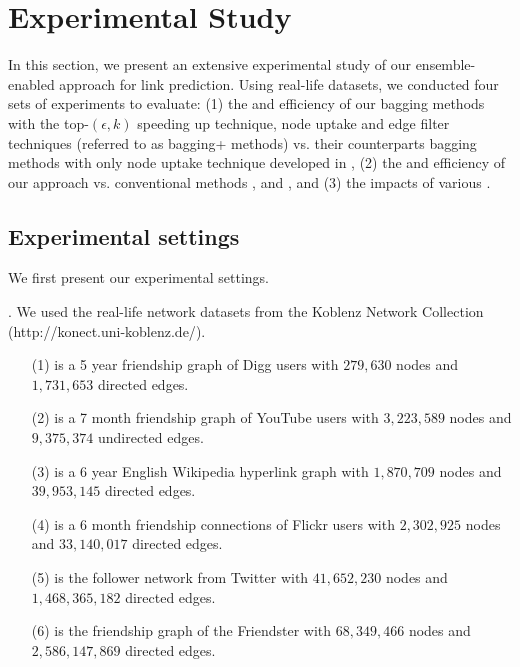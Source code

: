 \section{Experimental Study}
\label{sec-exp}

In this section, we present an extensive experimental study of our ensemble-enabled approach for link prediction.
Using real-life datasets, we conducted four sets of experiments to evaluate:
(1) the  and efficiency of our bagging methods with the top-$(\epsilon, k)$ speeding up technique,
node uptake and edge filter techniques (referred to as bagging+ methods)
vs. their counterparts bagging methods with only node uptake technique developed in \cite{liang2016},
(2) the  and efficiency of our approach vs. conventional methods \Aa \cite{adamic},
 and \BIGCLAM \cite{yang-wsdm2013},
and (3) the impacts of various .


\subsection{Experimental settings}

We first present our experimental settings.

. We used the real-life network datasets
from the Koblenz Network Collection ({\small http://konect.uni-koblenz.de/}).


\begin{enumerate}

\item[(1)] \Digg is a 5 year friendship graph of Digg users with
$279,630$ nodes and $1,731,653$ directed edges.

\item[(2)] \YouTube is a 7 month  friendship graph of YouTube users
with $3,223,589$ nodes and $9,375,374$ undirected edges.

\item[(3)]  \Wikipedia is a 6 year English Wikipedia hyperlink graph
with $1,870,709$ nodes and $39,953,145$ directed edges.

\item[(4)]  \Flickr is a 6 month friendship connections of Flickr users
with $2,302,925$ nodes and $33,140,017$ directed edges.

\item[(5)]  \Twitter is the follower network from Twitter with $41,652,230$ nodes
  and $1,468,365,182$ directed edges.

\item[(6)]  \Friendster is the friendship graph of the Friendster with $68,349,466$
  nodes and $2,586,147,869$ directed edges.

\end{enumerate}


